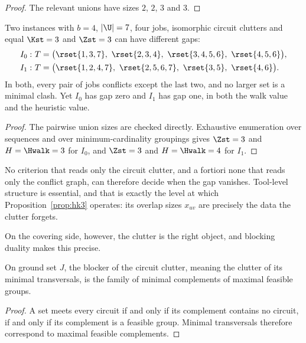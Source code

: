 \begin{proof}
The relevant unions have sizes $2$, $2$, $3$ and $3$.
\end{proof}

\begin{proposition}\label{prop:noclutter}
Two instances with $b=4$, $\lvert\U\rvert=7$, four jobs, isomorphic circuit clutters
and equal $\Kst=3$ and $\Zst=3$ can have different gaps:
\[
\begin{aligned}
  I_0:\ &T=\bigl(\rset{1,3,7},\ \rset{2,3,4},\ \rset{3,4,5,6},\ \rset{4,5,6}\bigr),\\
  I_1:\ &T=\bigl(\rset{1,2,4,7},\ \rset{2,5,6,7},\ \rset{3,5},\ \rset{4,6}\bigr).
\end{aligned}
\]
In both, every pair of jobs conflicts except the last two, and no larger set is a
minimal clash. Yet $I_0$ has gap zero and $I_1$ has gap one, in both the walk value
and the heuristic value.
\end{proposition}

\begin{proof}
The pairwise union sizes are checked directly. Exhaustive enumeration over sequences
and over minimum-cardinality groupings gives $\Zst=3$ and $H=\Hwalk=3$ for $I_0$, and
$\Zst=3$ and $H=\Hwalk=4$ for $I_1$.
\end{proof}

No criterion that reads only the circuit clutter, and a fortiori none that reads only
the conflict graph, can therefore decide when the gap vanishes. Tool-level structure
is essential, and that is exactly the level at which Proposition~\ref{prop:hk3}
operates: its overlap sizes $x_{uv}$ are precisely the data the clutter forgets.

On the covering side, however, the clutter is the right object, and blocking duality
makes this precise.

\begin{proposition}\label{prop:circblocker}
On ground set $J$, the blocker of the circuit clutter, meaning the clutter of its
minimal transversals, is the family of minimal complements of maximal feasible
groups.
\end{proposition}

\begin{proof}
A set meets every circuit if and only if its complement contains no circuit, if and
only if its complement is a feasible group. Minimal transversals therefore correspond
to maximal feasible complements.
\end{proof}

